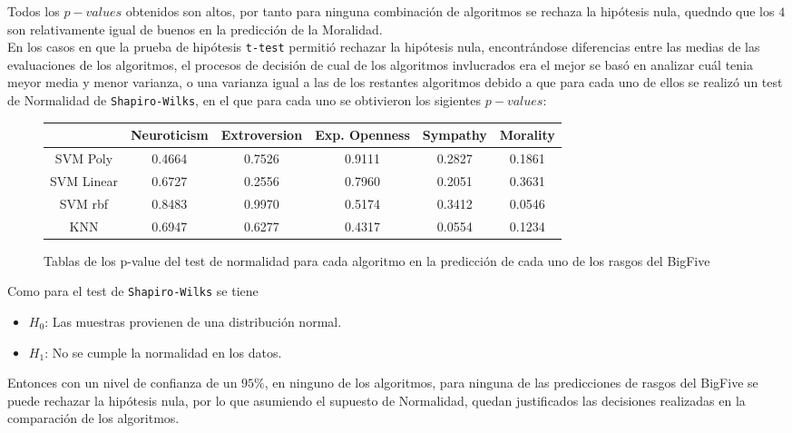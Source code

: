 \documentclass[10pt, a4paper]{article}
\begin{document}
    Todos los $p-values$ obtenidos son altos, por tanto para ninguna combinaci\'on de algoritmos se rechaza la hip\'otesis nula, quedndo 
    que los $4$ son relativamente igual de buenos en la predicci\'on de la Moralidad.\\

    En los casos en que la prueba de hip\'otesis \texttt{t-test} permiti\'o rechazar la hip\'otesis nula, encontr\'andose diferencias entre las medias de las evaluaciones de los algoritmos, el 
    procesos de decisi\'on de cual de los algoritmos invlucrados era el mejor se bas\'o en analizar cu\'al tenia meyor media y menor varianza, o una varianza igual a las de los restantes algoritmos debido 
    a que para cada uno de ellos se realiz\'o un test de Normalidad de \texttt{Shapiro-Wilks}, en el que para cada uno se obtivieron los sigientes $p-values$: 
    
    \begin{figure}[H]
        \centering
        \begin{tabular}{|c|c|c|c|c|c|}
            \cline{2-6}  \multicolumn{1}{c}{ }  & Neuroticism & Extroversion & Exp. Openness & Sympathy & Morality \\ 
            \hline SVM Poly & 0.4664 & 0.7526 & 0.9111 & 0.2827 & 0.1861 \\ 
            \hline SVM Linear  & 0.6727 & 0.2556 & 0.7960 & 0.2051 & 0.3631\\
            \hline SVM rbf & 0.8483 & 0.9970 & 0.5174 & 0.3412 & 0.0546 \\
            \hline KNN & 0.6947 & 0.6277 & 0.4317 & 0.0554 & 0.1234 \\ 
            \hline 
           
         \end{tabular}
         \caption{Tablas de los p-value del test de normalidad para cada algoritmo en la predicci\'on de cada uno de los rasgos del BigFive}
    \end{figure}

    Como para el test de \texttt{Shapiro-Wilks} se tiene
    
    \begin{itemize}
        \item [] $H_0$: Las muestras provienen de una distribuci\'on normal. 
        \item [] $H_1$: No se cumple la normalidad en los datos.
    \end{itemize}

    Entonces con un nivel de confianza de un $95\%$, en ninguno de los algoritmos, para ninguna de las predicciones de rasgos del BigFive se puede rechazar la hip\'otesis nula, 
    por lo que asumiendo el supuesto de Normalidad, quedan justificados las decisiones realizadas en la comparaci\'on de los algoritmos.
\end{document}
